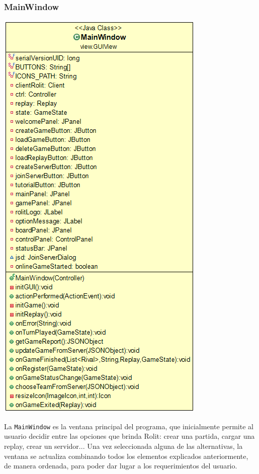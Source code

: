 \documentclass[../DocumentoOficial.tex]{subfiles}
\begin{document}
\subsubsection{MainWindow}
\begin{center}
\includegraphics[scale=0.55]{mainwindowuml.png}
\end{center}

La \texttt{MainWindow} es la ventana principal del programa, que inicialmente permite al usuario decidir entre las opciones que brinda Rolit: crear una partida, cargar una replay, crear un servidor... Una vez seleccionada alguna de las alternativas, la ventana se actualiza combinando todos los elementos explicados anteriormente, de manera ordenada, para poder dar lugar a los requerimientos del usuario.
\end{document}
